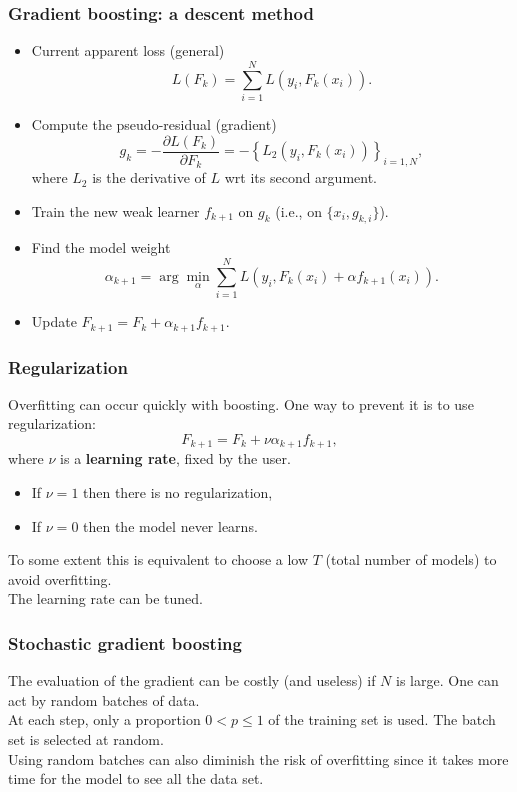 \begin{frame}
\frametitle{Gradient boosting: a descent method}
\small
\begin{itemize}
\item Current apparent loss (general)
$$
L(F_k) = \sum_{i=1}^N L(y_i, F_k(x_i)).
$$
\item Compute the pseudo-residual (gradient) 
$$
g_k = -\frac{\partial L(F_k)}{\partial F_k} = -\left\{L_2(y_i, F_k(x_i))\right\}_{i=1,N},
$$
where $L_2$ is the derivative of $L$ wrt its second argument.
\item Train the new weak learner $f_{k+1}$ on $g_k$ (i.e., on $\{x_i, g_{k,i}\}$).
\item Find the model weight
$$
\alpha_{k+1} = \arg\min_{\alpha} \sum_{i=1}^N L(y_i, F_k(x_i) + \alpha f_{k+1}(x_i)).
$$
\item Update $F_{k+1} = F_k + \alpha_{k+1} f_{k+1}$.
\end{itemize}
\normalsize
\end{frame}
\begin{frame}
\frametitle{Regularization}
Overfitting can occur quickly with boosting. One way to prevent it is to use regularization:
$$
F_{k+1} = F_{k} + \nu \alpha_{k+1} f_{k+1},
$$
where $\nu$ is a {\bf learning rate}, fixed by the user.
\begin{itemize}
\item If $\nu = 1$ then there is no regularization,
\item If $\nu = 0$ then the model never learns.
\end{itemize}
To some extent this is equivalent to choose a low $T$ (total number of models) to avoid overfitting.\\
\vspace{0.3cm}
The learning rate can be tuned.
\end{frame}
\begin{frame}
\frametitle{Stochastic gradient boosting}
The evaluation of the gradient can be costly (and useless) if $N$ is large. One can act by random batches of data.\\ 
\vspace{0.3cm}
At each step, only a proportion $0 < p \leq 1 $ of the training set is used. The batch set is selected at random.\\
\vspace{0.3cm}
Using random batches can also diminish the risk of overfitting since it takes more time for the model to see all the data set.
\end{frame}
